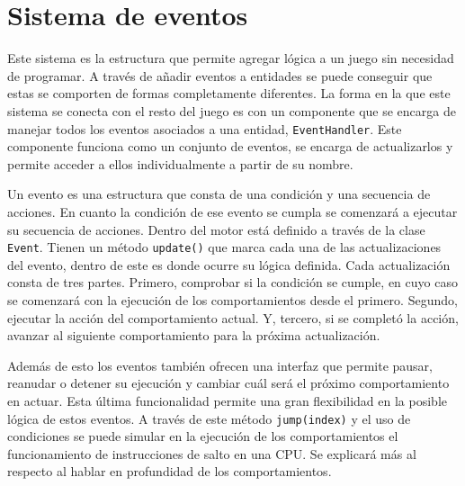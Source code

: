 \section{Sistema de eventos}
\label{sec:eventos}
Este sistema es la estructura que permite agregar lógica a un juego sin necesidad de programar. A través de añadir eventos a entidades se puede conseguir que estas se comporten de formas completamente diferentes. La forma en la que este sistema se conecta con el resto del juego es con un componente que se encarga de manejar todos los eventos asociados a una entidad, \texttt{EventHandler}. Este componente funciona como un conjunto de eventos, se encarga de actualizarlos y permite acceder a ellos individualmente a partir de su nombre.

\medskip

Un evento es una estructura que consta de una condición y una secuencia de acciones. En cuanto la condición de ese evento se cumpla se comenzará a ejecutar su secuencia de acciones. Dentro del motor está definido a través de la clase \texttt{Event}. Tienen un método \texttt{update()} que marca cada una de las actualizaciones del evento, dentro de este es donde ocurre su lógica definida. Cada actualización consta de tres partes. Primero, comprobar si la condición se cumple, en cuyo caso se comenzará con la ejecución de los comportamientos desde el primero. Segundo, ejecutar la acción del comportamiento actual. Y, tercero, si se completó la acción, avanzar al siguiente comportamiento para la próxima actualización. 

\medskip

Además de esto los eventos también ofrecen una interfaz que permite pausar, reanudar o detener su ejecución y cambiar cuál será el próximo comportamiento en actuar. Esta última funcionalidad permite una gran flexibilidad en la posible lógica de estos eventos. A través de este método \texttt{jump(index)} y el uso de condiciones se puede simular en la ejecución de los comportamientos el funcionamiento de instrucciones de salto en una CPU. Se explicará más al respecto al hablar en profundidad de los comportamientos. 


